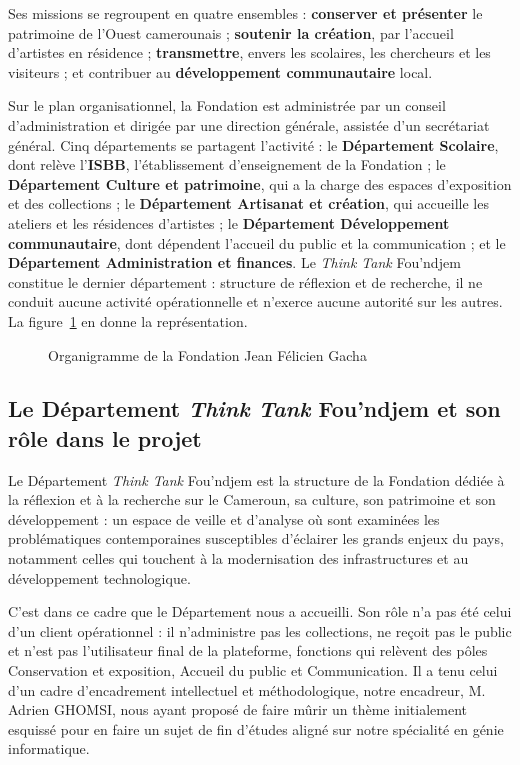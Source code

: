 Ses missions se regroupent en quatre ensembles : \textbf{conserver et présenter}
le patrimoine de l'Ouest camerounais ; \textbf{soutenir la création}, par
l'accueil d'artistes en résidence ; \textbf{transmettre}, envers les scolaires,
les chercheurs et les visiteurs ; et contribuer au \textbf{développement
communautaire} local.

Sur le plan organisationnel, la Fondation est administrée par un conseil
d'administration et dirigée par une direction générale, assistée d'un
secrétariat général. Cinq départements se partagent l'activité : le
\textbf{Département Scolaire}, dont relève l'\textbf{ISBB}, l'établissement
d'enseignement de la Fondation ; le \textbf{Département Culture et patrimoine},
qui a la charge des espaces d'exposition et des collections ; le
\textbf{Département Artisanat et création}, qui accueille les ateliers et les
résidences d'artistes ; le \textbf{Département Développement communautaire},
dont dépendent l'accueil du public et la communication ; et le
\textbf{Département Administration et finances}. Le \emph{Think Tank}
Fou'ndjem constitue le dernier département : structure de réflexion et de
recherche, il ne conduit aucune activité opérationnelle et n'exerce aucune
autorité sur les autres. La figure~\ref{fig:organigramme} en donne la
représentation.

\begin{figure}[!ht]
\centering
{}
\caption{Organigramme de la Fondation Jean Félicien Gacha}
\label{fig:organigramme}
\end{figure}


\subsection{Le Département \emph{Think Tank} Fou'ndjem et son rôle dans le projet}
\label{sec:thinktank}

Le Département \emph{Think Tank} Fou'ndjem est la structure de la Fondation
dédiée à la réflexion et à la recherche sur le Cameroun, sa culture, son
patrimoine et son développement : un espace de veille et d'analyse où sont
examinées les problématiques contemporaines susceptibles d'éclairer les grands
enjeux du pays, notamment celles qui touchent à la modernisation des
infrastructures et au développement technologique.

C'est dans ce cadre que le Département nous a accueilli. Son rôle n'a pas été
celui d'un client opérationnel : il n'administre pas les collections, ne reçoit
pas le public et n'est pas l'utilisateur final de la plateforme, fonctions qui
relèvent des pôles Conservation et exposition, Accueil du public et
Communication. Il a tenu celui d'un cadre d'encadrement intellectuel et
méthodologique, notre encadreur, M. Adrien GHOMSI, nous ayant proposé de faire
mûrir un thème initialement esquissé pour en faire un sujet de fin d'études
aligné sur notre spécialité en génie informatique.


